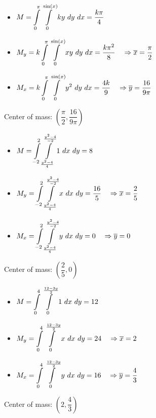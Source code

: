 \begin{Answer}
    
        \Question  
        \begin{itemize}
            \item $M = \displaystyle \int\limits_0^{\pi}\int\limits_{0}^{\sin(x)}ky \ dy\  dx = \dfrac{k \pi}{4}$ 
            \item $M_{y} = k \displaystyle \int\limits_0^{\pi}\int\limits_{0}^{\sin(x)} xy \ dy\  dx = \dfrac{k \pi^2}{8} \quad \Rightarrow \overline{x} = \dfrac{\pi}{2}$
            \item $M_{x} = k \displaystyle \int\limits_0^{\pi}\int\limits_{0}^{\sin(x)} y^2 \ dy\  dx = \dfrac{4 k }{9}  \quad \Rightarrow \overline{y} = \dfrac{16}{9\pi} $
        \end{itemize}
         Center of mass: $\left(\dfrac{\pi}{2}, \dfrac{16}{9\pi}\right)$
        
        \Question  
        \begin{itemize}
            \item $M = \displaystyle \int\limits_{-2}^{2} \displaystyle \int\limits_{\frac{y^2-4}{4}}^{\frac{y^2-4}{-2}} 1 \ dx\  dy = 8$ 
            \item $M_{y} = \displaystyle \int\limits_{-2}^{2}\displaystyle \int\limits_{\frac{y^2-4}{4}}^{\frac{y^2-4}{-2}} x \ dx\  dy = \dfrac{16}{5} \quad \Rightarrow \overline{x} = \dfrac{2}{5}$ 
            \item $M_{x} = \displaystyle \int\limits_{-2}^{2}\displaystyle \int\limits_{\frac{y^2-4}{4}}^{\frac{y^2-4}{-2}} y \ dx\  dy = 0 \quad \Rightarrow \overline{y} = 0 $ 
        \end{itemize}
        Center of mass: $\left(\dfrac{2}{5}, 0\right)$
        
        \Question
        \begin{itemize}
            \item $M = \displaystyle \int\limits_0^{4} \displaystyle \int\limits_{0}^{\frac{12-3y}{2}} 1 \ dx\  dy = 12$ 
            \item $M_{y} = \displaystyle \int\limits_0^{4} \displaystyle \int\limits_{0}^{\frac{12-3y}{2}} x \ dx\  dy = 24 \quad \Rightarrow \overline{x} = 2$ 
            \item $M_{x} = \displaystyle \int\limits_0^{4} \displaystyle \int\limits_{0}^{\frac{12-3y}{2}} y \ dx\  dy = 16 \quad \Rightarrow \overline{y} = \dfrac{4}{3}$
        \end{itemize}
        Center of mass: $\left(2,\dfrac{4}{3}\right)$
        
    
\end{Answer}  


